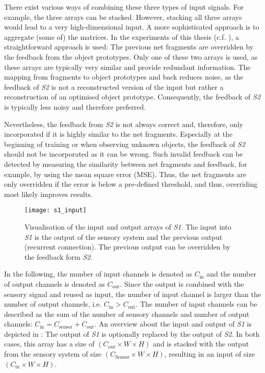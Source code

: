 There exist various ways of combining these three types of input signals. For example, the three arrays can be stacked.
However, stacking all three arrays would lead to a very high-dimensional input.
A more sophisticated approach is to aggregate (some of) the matrices.
In the experiments of this thesis (c.f. ), a straightforward approach is used: The previous net fragments are overridden by the feedback from the object prototypes.
Only one of these two arrays is used, as these arrays are typically very similar and provide redundant information. The mapping from fragments to object prototypes and back reduces noise, as the feedback of \emph{S2} is not a reconstructed version of the input but rather a reconstruction of an optimised object prototype. Consequently, the feedback of \emph{S2} is typically less noisy and therefore preferred.

Nevertheless, the feedback from \emph{S2} is not always correct and, therefore, only incorporated if it is highly similar to the net fragments. Especially at the beginning of training or when observing unknown objects, the feedback of \emph{S2} should not be incorporated as it can be wrong.
Such invalid feedback can be detected by measuring the similarity between net fragments and feedback, for example, by using the mean square error (MSE). Thus, the net fragments are only overridden if the error is below a pre-defined threshold, and thus, overriding most likely improves results.

\begin{figure}[h]
    \centering
    \texttt{[image: s1\_input]}
    \caption[Input and output of \emph{S1}]{Visualisation of the input and output arrays of \emph{S1}. The input into \emph{S1} is the output of the sensory system and the previous output (recurrent connection). The previous output can be overridden by the feedback form \emph{S2}.}
\end{figure}


In the following, the number of input channels is denoted as $C_{\text{in}}$ and the number of output channels is denoted as $C_{\text{out}}$. Since the output is combined with the sensory signal and reused as input, the number of input channel is larger than the number of output channels, i.e. $C_{\text{in}} > C_{\text{out}}$. 
The number of input channels can be described as the sum of the number of sensory channels and number of output channels: $C_{\text{in}} = C_{\text{sensor}} + C_{\text{out}}$.
An overview about the input and output of \emph{S1} is depicted in :
The output of \emph{S1} is optionally replaced by the output of \emph{S2}. In both cases, this array has a size of $(C_{\text{out}} \times W \times H)$ and is stacked with the output from the sensory system of size $(C_{\text{Sensor}} \times W \times H)$, resulting in an input of size $(C_{\text{in}} \times W \times H)$.


